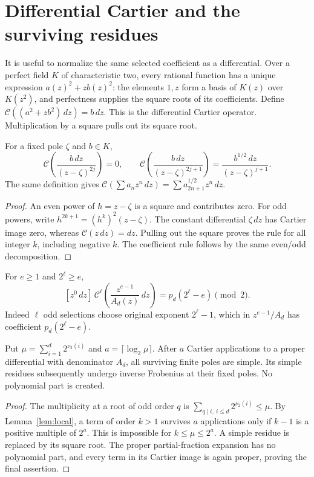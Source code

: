 \section{Differential Cartier and the surviving residues}
\label{sec:cartier}

It is useful to normalize the same selected coefficient as a differential.
Over a perfect field $K$ of characteristic two, every rational function
has a unique expression $a(z)^2+zb(z)^2$: the elements $1,z$ form a
basis of $K(z)$ over $K(z^2)$, and perfectness supplies the square
roots of its coefficients. Define
$\mathcal C((a^2+zb^2)\,dz)=b\,dz$.
This is the differential Cartier operator. Multiplication by a square
pulls out its square root.

\begin{lemma}\label{lem:local}
For a fixed pole $\zeta$ and $b\in K$,
\[
 \mathcal C\!\left(\frac{b\,dz}{(z-\zeta)^{2j}}\right)=0,\qquad
 \mathcal C\!\left(\frac{b\,dz}{(z-\zeta)^{2j+1}}\right)
       =\frac{b^{1/2}\,dz}{(z-\zeta)^{j+1}}.
\]
The same definition gives
$\mathcal C(\sum a_nz^n\,dz)=\sum a_{2n+1}^{1/2}z^n\,dz$.
\end{lemma}
\begin{proof}
An even power of $h=z-\zeta$ is a square and contributes zero.
For odd powers, write $h^{2k+1}=(h^k)^2(z-\zeta)$.
The constant differential $\zeta\,dz$ has Cartier image zero,
whereas $\mathcal C(z\,dz)=dz$. Pulling out the square proves
the rule for all integer $k$, including negative $k$.
The coefficient rule follows by the same even/odd decomposition.
\end{proof}

For $e\ge1$ and $2^\ell\ge e$,
\begin{equation}\label{eq:selection}
 [z^0\,dz]\,\mathcal C^\ell\!
             \left(\frac{z^{e-1}}{A_d(z)}\,dz\right)
                   =p_d(2^\ell-e)\pmod2.
\end{equation}
Indeed $\ell$ odd selections choose original exponent $2^\ell-1$,
which in $z^{e-1}/A_d$ has coefficient $p_d(2^\ell-e)$.

\begin{lemma}\label{lem:poles}
Put $\mu=\sum_{i=1}^d2^{\nu_2(i)}$ and
$a=\lceil\log_2\mu\rceil$. After $a$ Cartier applications to
a proper differential with denominator $A_d$, all surviving finite
poles are simple. Its simple residues subsequently undergo inverse
Frobenius at their fixed poles. No polynomial part is created.
\end{lemma}
\begin{proof}
The multiplicity at a root of odd order $q$ is
$\sum_{q\mid i,\ i\le d}2^{\nu_2(i)}\le\mu$.
By Lemma~\ref{lem:local}, a term of order $k>1$ survives $a$
applications only if $k-1$ is a positive multiple of $2^a$.
This is impossible for $k\le\mu\le2^a$. A simple residue is
replaced by its square root. The proper partial-fraction expansion
has no polynomial part, and every term in its Cartier image is again
proper, proving the final assertion.
\end{proof}

